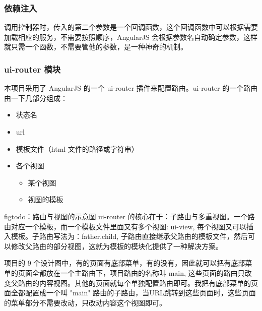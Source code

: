 \documentclass[UTF8]{ctexbook}
\begin{document}
{{            \subsubsection{依赖注入}
              \label{subsubsec:依赖注入}
                调用控制器时，传入的第二个参数是一个回调函数，这个回调函数中可以根据需要加载相应的服务，不需要按照顺序，AngularJS 会根据参数名自动确定参数，这样就只需一个函数，不需要管他的参数，是一种神奇的机制。

            \subsubsection{ui-router 模块}
              \label{subsubsec:ui_router_模块}
                本项目采用了 AngularJS 的一个 ui-router 插件来配置路由。ui-router 的一个路由由一下几部分组成：
                \begin{itemize}
                  \item 状态名
                  \item url
                  \item 模板文件（html 文件的路径或字符串）
                  \item 各个视图
                  \begin{itemize}
                    \item 某个视图
                    \item 视图的模板
                  \end{itemize}
                \end{itemize}
                figtodo：路由与视图的示意图
                ui-router 的核心在于：子路由与多重视图。一个路由对应一个模板，而一个模板文件里面又有多个视图: ui-view, 每个视图又可以插入模板。子路由写法为：father.child, 子路由直接继承父路由的模板文件，然后可以修改父路由的部分视图，这就为模板的模块化提供了一种解决方案。
                \par
                项目的 9 个设计图中，有的页面有底部菜单，有的没有，因此就可以把有底部菜单的页面全都放在一个主路由下，项目路由的名称叫 main, 这些页面的路由只改变父路由的内容视图。其他的页面就每个单独配置路由即可。我把有底部菜单的页面全都配置成一个叫 "main" 路由的子路由，当URL跳转到这些页面时，这些页面的菜单部分不需要改动，只改动内容这个视图即可。

}}
\end{document}
